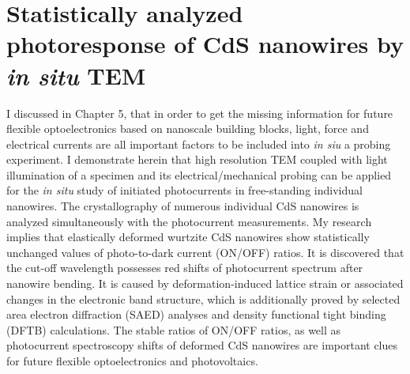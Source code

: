 

\chapter{Statistically analyzed photoresponse of CdS nanowires by \emph{in situ} TEM}

 I discussed in Chapter 5, that in order to get the missing information for future flexible optoelectronics based on nanoscale building blocks, light, force and electrical currents are all important factors to be included into {\em in siu} a probing experiment. 
I demonstrate herein that high resolution TEM coupled with light illumination of a specimen and its electrical/mechanical probing can be applied for the {\em in situ} study of initiated photocurrents in free-standing individual nanowires. 
The crystallography of numerous individual CdS nanowires is analyzed simultaneously with the photocurrent measurements. 
My research implies that elastically deformed wurtzite CdS nanowires show statistically unchanged values of photo-to-dark current (ON/OFF) ratios. 
It is discovered that the cut-off wavelength possesses red shifts of photocurrent spectrum after nanowire bending. 
It is caused by deformation-induced lattice strain or associated changes in the electronic band structure, which is additionally proved by selected area electron diffraction (SAED) analyses and density functional tight binding (DFTB) calculations. 
The stable ratios of ON/OFF ratios, as well as photocurrent spectroscopy shifts of deformed CdS nanowires are important clues for future flexible optoelectronics and photovoltaics.\\

